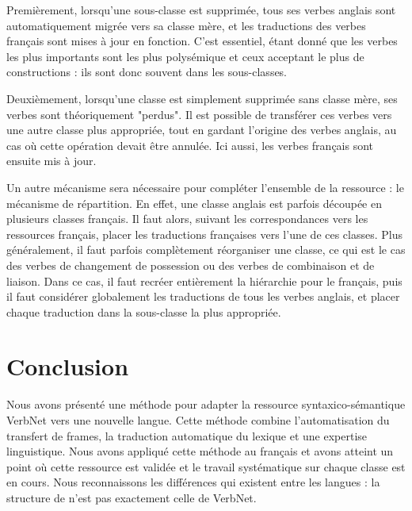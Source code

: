 Premièrement, lorsqu'une sous-classe est supprimée, tous ses verbes anglais sont
automatiquement migrée vers sa classe mère, et les traductions des verbes
français sont mises à jour en fonction. C'est essentiel, étant donné que les
verbes les plus importants sont les plus polysémique et ceux acceptant le plus
de constructions : ils sont donc souvent dans les sous-classes.

Deuxièmement, lorsqu'une classe est simplement supprimée sans classe mère, ses
verbes sont théoriquement "perdus". Il est possible de transférer ces verbes
vers une autre classe plus appropriée, tout en gardant l'origine des verbes
anglais, au cas où cette opération devait être annulée. Ici aussi, les verbes
français sont ensuite mis à jour.

Un autre mécanisme sera nécessaire pour compléter l'ensemble de la
ressource : le mécanisme de répartition. En effet, une classe anglais est
parfois découpée en plusieurs classes français. Il faut alors, suivant les
correspondances vers les ressources français, placer les traductions
françaises vers l'une de ces classes. Plus généralement, il faut parfois
complètement réorganiser une classe, ce qui est le cas des verbes de changement
de possession ou des verbes de combinaison et de liaison. Dans ce cas, il faut
recréer entièrement la hiérarchie pour le français, puis il faut considérer
globalement les traductions de tous les verbes anglais, et placer chaque
traduction dans la sous-classe la plus appropriée.

\section*{Conclusion}

Nous avons présenté une méthode pour adapter la ressource syntaxico-sémantique
VerbNet vers une nouvelle langue. Cette méthode combine l'automatisation du
transfert de frames, la traduction automatique du lexique et une expertise
linguistique. Nous avons appliqué cette méthode au français et avons atteint un
point où cette ressource est validée et le travail systématique sur chaque
classe est en cours. Nous reconnaissons les différences qui existent entre les
langues : la structure de \verbenet{} n'est pas exactement celle de VerbNet.


